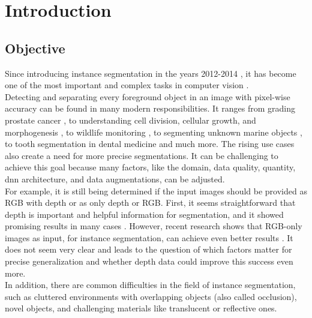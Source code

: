 
\chapter{Introduction}
\label{chap:kapitel1}



	\section{Objective}    %
	\label{sec:objective-and-importance}	
		Since introducing instance segmentation in the years 2012-2014 \cite{Yang2012}\cite{Silbermann2012}\cite{Hariharan2014}, it has become one of the most important and complex tasks in computer vision \cite{Sharma2022}. \\
		Detecting and separating every foreground object in an image with pixel-wise accuracy can be found in many modern responsibilities. It ranges from grading prostate cancer \cite{Hassan2022}, to understanding cell division, cellular growth, and morphogenesis \cite{Kar2022}, to wildlife monitoring \cite{Haucke2021}, to segmenting unknown marine objects \cite{Hu2024}, to tooth segmentation in dental medicine \cite{Brahmi2023} and much more. The rising use cases also create a need for more precise segmentations. It can be challenging to achieve this goal because many factors, like the domain, data quality, quantity, \ac{dnn} architecture, and data augmentations, can be adjusted.\\
		For example, it is still being determined if the input images should be provided as RGB with depth or as only depth or RGB. First, it seems straightforward that depth is important and helpful information for segmentation, and it showed promising results in many cases \cite{Danielczuk2019}\cite{Xie2021}. However, recent research shows that RGB-only images as input, for instance segmentation, can achieve even better results \cite{Raj2023}. It does not seem very clear and leads to the question of which factors matter for precise generalization and whether depth data could improve this success even more.\\
		In addition, there are common difficulties in the field of instance segmentation, such as cluttered environments with overlapping objects (also called occlusion), novel objects, and challenging materials like translucent or reflective ones.\\
